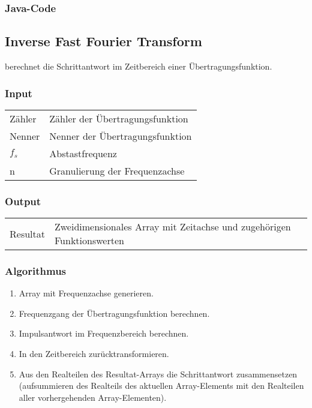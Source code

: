 \subsubsection*{Java-Code}



\clearpage
\subsection{Inverse Fast Fourier Transform}
\label{app:algo:ifft}

  berechnet   die  Schrittantwort  im   Zeitbereich  einer
\"Ubertragungsfunktion.

\subsubsection*{Input}

\begin{tabular}{p{40mm}l}
    Z\"ahler & Z\"ahler der \"Ubertragungsfunktion                             \\
    Nenner   & Nenner der \"Ubertragungsfunktion                               \\
    $f_s$    & Abstastfrequenz                                                 \\
    n        & Granulierung der Frequenzachse
\end{tabular}

\subsubsection*{Output}
\begin{tabular}{p{40mm}l}
    Resultat & \parbox[t][4em][s]{0.7\textwidth}{Zweidimensionales Array mit Zeitachse und zugeh\"origen Funktionswerten}
\end{tabular}

\subsubsection*{Algorithmus}
\begin{enumerate}
    \item
        Array mit Frequenzachse generieren.
    \item
        Frequenzgang der \"Ubertragungsfunktion berechnen.
    \item
        Impulsantwort im Frequenzbereich berechnen.
    \item
        In den Zeitbereich zur\"ucktransformieren.
    \item
        Aus   den   Realteilen    des   Resultat-Arrays   die   Schrittantwort
        zusammensetzen    (aufsummieren    des   Realteils    des    aktuellen
        Array-Elements    mit    den     Realteilen    aller    vorhergehenden
        Array-Elementen).
\end{enumerate}

